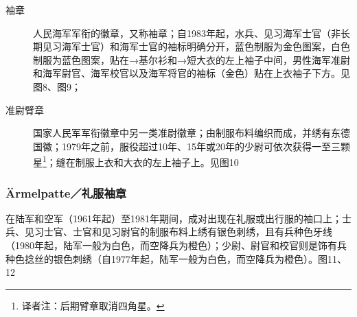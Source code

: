 \begin{description}

    \item[袖章] 人民海军军衔的徽章，又称袖章；自1983年起，水兵、见习海军士官（非长期见习海军士官）和海军士官的袖标明确分开，蓝色制服为金色图案，白色制服为蓝色图案，贴在→基尔衫和→短大衣的左上袖子中间，男性海军准尉和海军尉官、海军校官以及海军将官的袖标（金色）贴在上衣袖子下方。见图8、图9；

    \item[准尉臂章] 国家人民军军衔徽章中另一类准尉徽章；由制服布料编织而成，并绣有东德国徽；1979年之前，服役超过10年、15年或20年的少尉可依次获得一至三颗星\footnote{译者注：后期臂章取消四角星。\cite{clarionv}}；缝在制服上衣和大衣的左上袖子上。见图10 

\end{description}

\subsubsection*{Ärmelpatte／礼服袖章}

在陆军和空军（1961年起）至1981年期间，成对出现在礼服或出行服的袖口上；士兵、见习士官、士官和见习尉官的制服布料上绣有银色刺绣，且有兵种色牙线（1980年起，陆军一般为白色，而空降兵为橙色）；少尉、尉官和校官则是饰有兵种色捻丝的银色刺绣（自1977年起，陆军一般为白色，而空降兵为橙色）。图11、12

